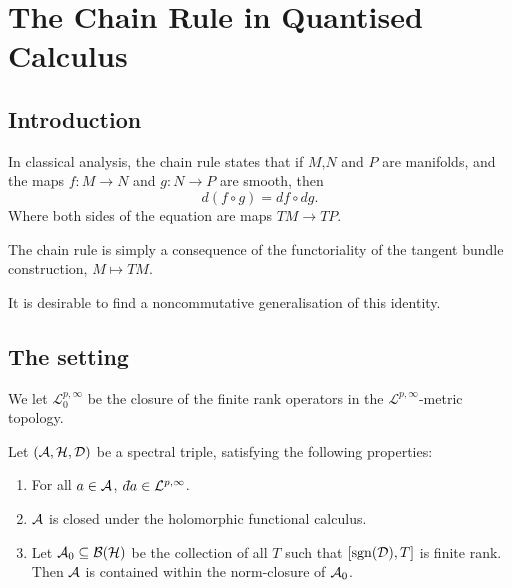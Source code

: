 
\chapter{The Chain Rule in Quantised Calculus} %

\label{TheChainRule} %



\section{Introduction}
In classical analysis, the chain rule states that if $M$,$N$ and $P$ are manifolds, 
 and the maps $f:M\rightarrow N$ and $g:N\rightarrow P$ are smooth, then
\begin{equation*}
    d(f\circ g) = df \circ dg.
\end{equation*}
Where both sides of the equation are maps $TM\rightarrow TP$.

\begin{remark}
    The chain rule is simply a consequence of the functoriality of the tangent
    bundle construction, $M\mapsto TM$.
\end{remark}

 It is desirable
to find a noncommutative generalisation of this identity.


\section{The setting}
We let $\mathcal{L}^{p,\infty}_0$ be the closure of the finite rank
operators in the $\mathcal{L}^{p,\infty}$-metric topology.

Let $(\mathcal{A},\mathcal{H},\mathcal{D})$ be a spectral triple, satisfying the following properties:
\begin{enumerate}
    \item{} For all $a \in \mathcal{A}$, $\qd a \in \mathcal{L}^{p,\infty}$.
    \item{} $\mathcal{A}$ is closed under the holomorphic functional calculus.
    \item{} Let $\mathcal{A}_0 \subseteq \mathcal{B}(\mathcal{H})$ be the collection of all
    $T$ such that $[\operatorname{sgn}(\mathcal{D}),T]$ is finite rank. Then $\mathcal{A}$ is contained
    within the norm-closure of $\mathcal{A}_0$.
\end{enumerate}

